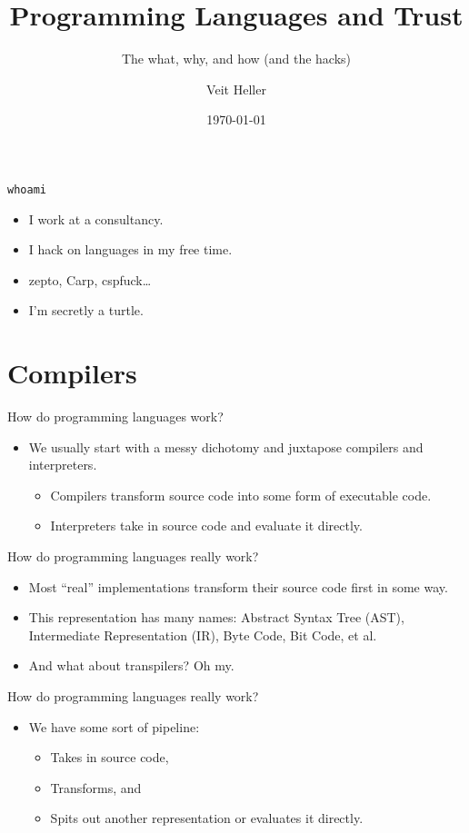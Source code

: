 \documentclass[aspectratio=169]{beamer}
\title{Programming Languages and Trust}
\subtitle{The what, why, and how (and the hacks)}
\date{\today}
\author{Veit Heller}
\institute{Datengarten | CCCB}
\begin{document}
  \maketitle
  \begin{frame}{\texttt{whoami}}
    \begin{itemize}
      \item I work at a consultancy.
      \item I hack on languages in my free time.
      \item zepto, Carp, cspfuck\ldots
      \item I’m secretly a turtle.
    \end{itemize}
  \end{frame}
  \section{Compilers}
  \begin{frame}{How do programming languages work?}
    \begin{itemize}
      \item We usually start with a messy dichotomy and juxtapose compilers and interpreters.
      \begin{itemize}
        \item Compilers transform source code into some form of executable code.
        \item Interpreters take in source code and evaluate it directly.
      \end{itemize}
    \end{itemize}
  \end{frame}
  \begin{frame}{How do programming languages really work?}
    \begin{itemize}
      \item Most “real” implementations transform their source code first in some way.
      \item This representation has many names: Abstract Syntax Tree (AST), Intermediate Representation (IR), Byte Code, Bit Code, et al.
      \item And what about transpilers? Oh my.
    \end{itemize}
  \end{frame}
  \begin{frame}{How do programming languages really work?}
    \begin{itemize}
      \item We have some sort of pipeline:
      \begin{itemize}
        \item Takes in source code,
        \item Transforms, and
        \item Spits out another representation or evaluates it directly.
      \end{itemize}
    \end{itemize}
  \end{frame}
\end{document}
